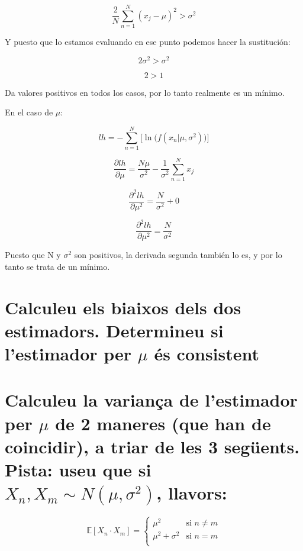 \documentclass[a4paper,10pt]{article}
\begin{document}
\begin{equation*}
\frac{2}{N}\sum_{n = 1}^{N} (x_j - \mu)^2 > \sigma^2
\end{equation*}

Y puesto que lo estamos evaluando en ese punto podemos hacer la sustitución:

\begin{equation*}
2\sigma^2 > \sigma^2
\end{equation*}

\begin{equation*}
2 > 1
\end{equation*}

Da valores positivos en todos los casos, por lo tanto realmente es un mínimo.

En el caso de $\mu$:

\begin{equation*}
lh = - \sum_{n = 1}^{N} \Big[ \ln{\big( f(x_n | \mu, \sigma^2)\big)} \Big]
\end{equation*}

\begin{equation*}
\frac{\partial lh}{\partial \mu} = \frac{N\mu}{\sigma^2} - \frac{1}{\sigma^2}\sum_{n = 1}^{N} x_j
\end{equation*}

\begin{equation*}
\frac{\partial^2 lh}{\partial \mu^2} = \frac{N}{\sigma^2} + 0
\end{equation*}

\begin{equation*}
\frac{\partial^2 lh}{\partial \mu^2} = \frac{N}{\sigma^2}
\end{equation*}

Puesto que N y $\sigma^2$ son positivos, la derivada segunda también lo es, y por lo tanto se trata de un mínimo.

\section{Calculeu els biaixos dels dos estimadors. Determineu si l'estimador per $\mu$ és consistent}

\section{Calculeu la variança de l'estimador per $\mu$ de 2 maneres (que han de coincidir), a triar de les 3 següents. Pista: useu que si $X_n,X_m \sim N(\mu,\sigma^2)$, llavors:}

\begin{equation*}
\mathbb{E} [ X_n \cdot X_m ] = 
 \begin{cases} 
      \mu^2 & \text{si } n \neq m \\
      \mu^2 + \sigma^2 & \text{si } n = m\\
   \end{cases}
\end{equation*}
\end{document}
